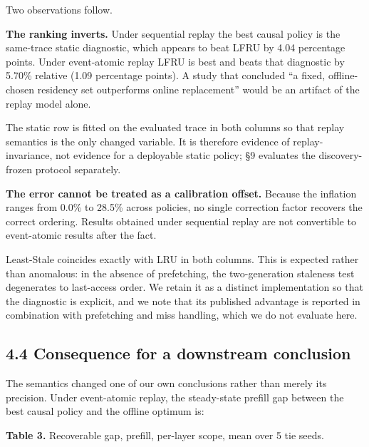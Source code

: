 \documentclass[
  10pt,
  letterpaper,
  10pt]{article}
\begin{document}
Two observations follow.

\textbf{The ranking inverts.} Under sequential replay the best causal
policy is the same-trace static diagnostic, which appears to beat LFRU
by 4.04 percentage points. Under event-atomic replay LFRU is best and
beats that diagnostic by 5.70\% relative (1.09 percentage points). A
study that concluded ``a fixed, offline-chosen residency set outperforms
online replacement'' would be an artifact of the replay model alone.

The static row is fitted on the evaluated trace in both columns so that
replay semantics is the only changed variable. It is therefore evidence
of replay-invariance, not evidence for a deployable static policy; §9
evaluates the discovery-frozen protocol separately.

\textbf{The error cannot be treated as a calibration offset.} Because
the inflation ranges from 0.0\% to 28.5\% across policies, no single
correction factor recovers the correct ordering. Results obtained under
sequential replay are not convertible to event-atomic results after the
fact.

Least-Stale coincides exactly with LRU in both columns. This is expected
rather than anomalous: in the absence of prefetching, the two-generation
staleness test degenerates to last-access order. We retain it as a
distinct implementation so that the diagnostic is explicit, and we note
that its published advantage is reported in combination with prefetching
and miss handling, which we do not evaluate here.

\subsection{4.4 Consequence for a downstream
conclusion}\label{consequence-for-a-downstream-conclusion}

The semantics changed one of our own conclusions rather than merely its
precision. Under event-atomic replay, the steady-state prefill gap
between the best causal policy and the offline optimum is:

\textbf{Table 3.} Recoverable gap, prefill, per-layer scope, mean over 5
tie seeds.
\end{document}
